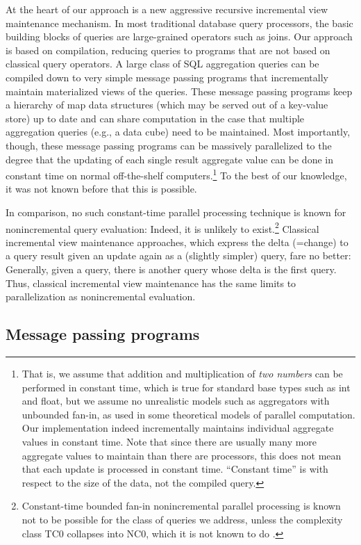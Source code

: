 At the heart of our approach is a new aggressive recursive incremental
view maintenance mechanism.
In most traditional database query processors, the  basic building blocks of
queries are large-grained operators such as joins.
Our approach is based on compilation, reducing
queries to programs that are not based on classical query operators.
A large class of
SQL aggregation queries can be compiled down to very simple message
passing programs that incrementally maintain materialized views of
the queries. These message passing programs keep a hierarchy of map data
structures (which may be served out of a key-value store) up to date
and can share computation in the case that multiple aggregation queries (e.g.,
a data cube) need to be maintained.  Most importantly, though, these message
passing programs can be massively parallelized to the degree that the updating
of each single result aggregate value can be done in constant time on normal
off-the-shelf computers.\footnote{That is,
we assume that addition and multiplication
of {\em two numbers} can be performed in constant time, which is true for
%
%
standard base types such as int and float,
but we assume no unrealistic models such
as aggregators with unbounded fan-in, as used in some theoretical models of
parallel computation. Our implementation indeed incrementally maintains
individual aggregate values in constant time. Note that since there are
usually many more aggregate values to maintain than there are processors,
this does not mean that each update is processed in constant time.
``Constant time'' is with respect to the size of the data, not the compiled
query.}
To the best of our knowledge, it was not known before
that this is possible.

In comparison, no such constant-time parallel processing technique
is known for nonincremental query
evaluation: Indeed, it is unlikely to exist.\footnote{Constant-time
bounded fan-in nonincremental
parallel processing is known not to be possible for
the class of queries we address,
unless the complexity class TC0 collapses into NC0, which it is not known
to do \cite{Joh90}.} Classical incremental view maintenance approaches, which
express the delta (=change) to a query result given an update again
as a (slightly simpler) query, fare no better: Generally,
given a query, there is another query whose delta is the first query.
Thus, classical incremental view maintenance has the same limits to
parallelization as nonincremental evaluation.


\subsection{Message passing programs}


